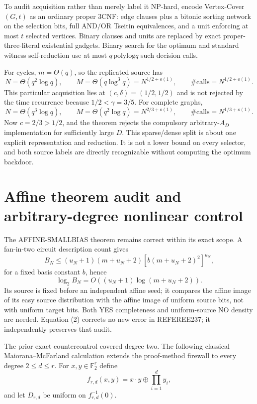 \documentclass[11pt]{article}
\begin{document}
To audit acquisition rather than merely label it NP-hard, encode
Vertex-Cover$(G,t)$ as an ordinary proper 3CNF: edge clauses plus a bitonic
sorting network on the selection bits, full AND/OR Tseitin equivalences, and a
unit enforcing at most $t$ selected vertices.  Binary clauses and units are
replaced by exact proper-three-literal existential gadgets.  Binary search for
the optimum and standard witness self-reduction use at most $q\,\mathrm{polylog}
q$ such decision calls.

For cycles, $m=\Theta(q)$, so the replicated source has
\[
 N=\Theta(q^2\log q),\qquad
 M=\Theta(q\log^3q)=N^{1/2+o(1)},\qquad
 \#\text{calls}=N^{1/2+o(1)}.
\]
This particular acquisition lies at $(c,\delta)=(1/2,1/2)$ and is not rejected
by the time recurrence because $1/2<\gamma=3/5$.  For complete graphs,
\[
 N=\Theta(q^3\log q),\qquad
 M=\Theta(q^2\log q)=N^{2/3+o(1)},\qquad
 \#\text{calls}=N^{1/3+o(1)}.
\]
Now $c=2/3>1/2$, and the theorem rejects the compulsory arbitrary-$A_D$
implementation for sufficiently large $D$.  This sparse/dense split is about
one explicit representation and reduction.  It is not a lower bound on every
selector, and both source labels are directly recognizable without computing
the optimum backdoor.

\section{Affine theorem audit and arbitrary-degree nonlinear control}
The AFFINE-SMALLBIAS theorem remains correct within its exact scope.  A
fan-in-two circuit description count gives
\[
 B_N\le (u_N+1)(m+u_N+2)
       [b(m+u_N+2)^2]^{u_N},
\]
for a fixed basis constant $b$, hence
\[
 \log_2B_N=O((u_N+1)\log(m+u_N+2)).                 \tag{2}
\]
Its source is fixed before an independent affine seed; it compares the affine
image of its easy source distribution with the affine image of uniform source
bits, not with uniform target bits.  Both YES completeness and uniform-source
NO density are needed.  Equation (2) corrects no new error in REFEREE237; it
independently preserves that audit.

The prior exact countercontrol covered degree two.  The following classical
Maiorana--McFarland calculation extends the proof-method firewall to every
degree $2\le d\le r$.  For $x,y\in\mathbb F_2^r$ define
\[
 f_{r,d}(x,y)=x\cdot y\oplus\prod_{i=1}^{d}y_i,
\]
and let $D_{r,d}$ be uniform on $f_{r,d}^{-1}(0)$.
\end{document}
